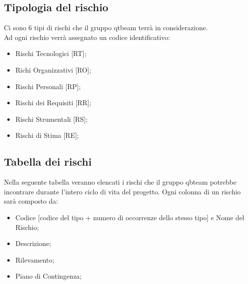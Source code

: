\subsection{Tipologia del rischio}
Ci sono 6 tipi di rischi che il gruppo qtbeam terrà in considerazione. 
\\Ad ogni rischio verrà assegnato un codice identificativo:
\begin{itemize}
	\item Rischi Tecnologici [RT];
	\item Richi Organizzativi [RO];
	\item Rischi Personali [RP];
	\item Rischi dei Requisiti [RR];
	\item Rischi Strumentali [RS];
	\item Rischi di Stima [RE];
\end{itemize}

\subsection{Tabella dei rischi}
Nella seguente tabella veranno elencati i rischi che il gruppo qbteam potrebbe incontrare durante l'intero ciclo di vita del progetto.
Ogni colonna di un rischio sarà composto da:
\begin{itemize}
	\item Codice [codice del tipo + numero di occorrenze dello stesso tipo] e Nome del Rischio;
	\item Descrizione;
	\item Rilevamento;
	\item Piano di Contingenza;
\end{itemize}


